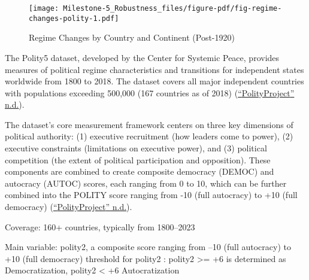 \documentclass[
  letterpaper,
  DIV=11,
  numbers=noendperiod]{scrartcl}
\begin{document}
\begin{figure}[H]

{\centering \texttt{[image: Milestone-5\_Robustness\_files/figure-pdf/fig-regime-changes-polity-1.pdf]}

}

\caption{\label{fig-regime-changes-polity}Regime Changes by Country and
Continent (Post-1920)}

\end{figure}

The Polity5 dataset, developed by the Center for Systemic Peace,
provides measures of political regime characteristics and transitions
for independent states worldwide from 1800 to 2018. The dataset covers
all major independent countries with populations exceeding 500,000 (167
countries as of 2018)
(\protect\hyperlink{ref-noauthor_polityproject_nodate}{{``{PolityProject}''}
n.d.}).

The dataset's core measurement framework centers on three key dimensions
of political authority: (1) executive recruitment (how leaders come to
power), (2) executive constraints (limitations on executive power), and
(3) political competition (the extent of political participation and
opposition). These components are combined to create composite democracy
(DEMOC) and autocracy (AUTOC) scores, each ranging from 0 to 10, which
can be further combined into the POLITY score ranging from -10 (full
autocracy) to +10 (full democracy)
(\protect\hyperlink{ref-noauthor_polityproject_nodate}{{``{PolityProject}''}
n.d.}).

Coverage: 160+ countries, typically from 1800--2023

Main variable: polity2, a composite score ranging from --10 (full
autocracy) to +10 (full democracy) threshold for polity2 : polity2
\textgreater= +6 is determined as Democratization, polity2 \textless{}
+6 Autocratization

\begin{table}

\end{table}
\end{document}

